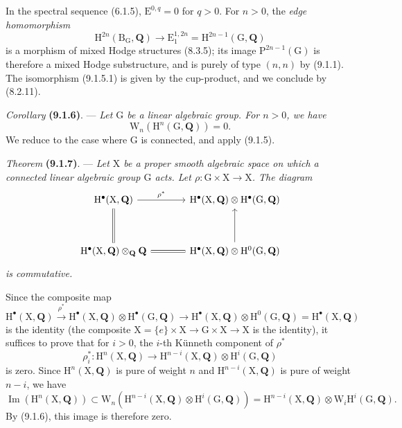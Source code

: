 \documentclass[11pt,leqno]{article}
\newcommand{\Page}[1]{\ifvmode\noindent\else\unskip\ \fi{\footnotesize\textcolor{gray}{[p.\,#1]}}\ \ignorespaces}
\begin{document}
In the spectral sequence (6.1.5), \(\mathrm{E}^{0,q}=0\) for \(q>0\). For \(n>0\), the \textit{edge homomorphism}
\[
\mathrm{H}^{2n}(\mathrm{B}_{\mathrm{G}},\mathbf{Q})
\to\mathrm{E}_{1}^{1,2n}
=\mathrm{H}^{2n-1}(\mathrm{G},\mathbf{Q})
\]
is a morphism of mixed Hodge structures (8.3.5); its image \(\mathrm{P}^{2n-1}(\mathrm{G})\) is therefore a mixed Hodge substructure, and is purely of type \((n,n)\) by (9.1.1). The isomorphism (9.1.5.1) is given by the cup-product, and we conclude by (8.2.11).

\textit{Corollary} \textbf{(9.1.6)}. — \textit{Let \(\mathrm{G}\) be a linear algebraic group. For \(n>0\), we have}
\[
\mathrm{W}_{n}(\mathrm{H}^{n}(\mathrm{G},\mathbf{Q}))=0.
\]
We reduce to the case where \(\mathrm{G}\) is connected, and apply (9.1.5).

\textit{Theorem} \textbf{(9.1.7)}. — \textit{Let \(\mathrm{X}\) be a proper smooth algebraic space on which a connected linear algebraic group \(\mathrm{G}\) acts. Let \(\rho:\mathrm{G}\times\mathrm{X}\to\mathrm{X}\). The diagram}
\Page{47}
\[
\begin{tikzcd}[ampersand replacement=\&, column sep=large, row sep=3.5em]
\mathrm{H}^{\bullet}(\mathrm{X},\mathbf{Q})
  \arrow[r, "\rho^{*}"] \arrow[d, equal]
\&
\mathrm{H}^{\bullet}(\mathrm{X},\mathbf{Q})\otimes
\mathrm{H}^{\bullet}(\mathrm{G},\mathbf{Q})
\\
\mathrm{H}^{\bullet}(\mathrm{X},\mathbf{Q})\otimes_{\mathbf{Q}}\mathbf{Q}
  \arrow[r, equal]
\&
\mathrm{H}^{\bullet}(\mathrm{X},\mathbf{Q})\otimes
\mathrm{H}^{0}(\mathrm{G},\mathbf{Q})
  \arrow[u]
\end{tikzcd}
\]
\textit{is commutative.}

Since the composite map
\[
\mathrm{H}^{\bullet}(\mathrm{X},\mathbf{Q})
\xrightarrow{\rho^{*}}
\mathrm{H}^{\bullet}(\mathrm{X},\mathbf{Q})\otimes\mathrm{H}^{\bullet}(\mathrm{G},\mathbf{Q})
\to
\mathrm{H}^{\bullet}(\mathrm{X},\mathbf{Q})\otimes\mathrm{H}^{0}(\mathrm{G},\mathbf{Q})
=\mathrm{H}^{\bullet}(\mathrm{X},\mathbf{Q})
\]
is the identity (the composite \(\mathrm{X}=\{e\}\times\mathrm{X}\to\mathrm{G}\times\mathrm{X}\to\mathrm{X}\) is the identity), it suffices to prove that for \(i>0\), the \(i\)-th Künneth component of \(\rho^{*}\)
\[
\rho_{i}^{*}:\mathrm{H}^{n}(\mathrm{X},\mathbf{Q})
\to
\mathrm{H}^{n-i}(\mathrm{X},\mathbf{Q})\otimes\mathrm{H}^{i}(\mathrm{G},\mathbf{Q})
\]
is zero. Since \(\mathrm{H}^{n}(\mathrm{X},\mathbf{Q})\) is pure of weight \(n\) and \(\mathrm{H}^{n-i}(\mathrm{X},\mathbf{Q})\) is pure of weight \(n-i\), we have
\[
\operatorname{Im}(\mathrm{H}^{n}(\mathrm{X},\mathbf{Q}))
\subset
\mathrm{W}_{n}(\mathrm{H}^{n-i}(\mathrm{X},\mathbf{Q})\otimes\mathrm{H}^{i}(\mathrm{G},\mathbf{Q}))
=
\mathrm{H}^{n-i}(\mathrm{X},\mathbf{Q})\otimes\mathrm{W}_{i}\mathrm{H}^{i}(\mathrm{G},\mathbf{Q}).
\]
By (9.1.6), this image is therefore zero.
\end{document}
